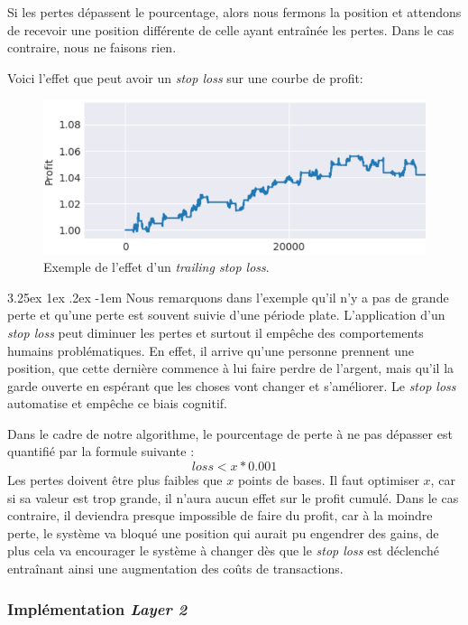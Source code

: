 \documentclass[a4paper, 11pt]{article}
\makeatletter
\renewcommand\paragraph{\@startsection{paragraph}{5}{\z@}%
  {3.25ex \@plus1ex \@minus.2ex}%
  {-1em}%
  {\normalfont\normalsize\bfseries}}
\makeatother
\begin{document}
Si les pertes dépassent le pourcentage, alors nous fermons la position et attendons de recevoir une position différente de celle ayant entraînée les pertes.
Dans le cas contraire, nous ne faisons rien.

Voici l'effet que peut avoir un \textit{stop loss} sur une courbe de profit:
\begin{figure}[H]
\centering
\includegraphics[scale=0.5]{images/stop_loss}
\caption{Exemple de l'effet d'un \textit{trailing stop loss}.}
\end{figure}

\paragraph{}
Nous remarquons dans l'exemple qu'il n'y a pas de grande perte et qu'une perte est souvent suivie d'une période plate. L'application d'un \textit{stop loss}
peut diminuer les pertes et surtout il empêche des comportements humains problématiques. En effet, il arrive qu'une personne prennent une position, que
cette dernière commence à lui faire perdre de l'argent, mais qu'il la garde ouverte en espérant que les choses vont changer et s'améliorer. Le \textit{stop loss}
automatise et empêche ce biais cognitif.

Dans le cadre de notre algorithme, le pourcentage de perte à ne pas dépasser est quantifié par la formule suivante :
$$loss < x * 0.001$$
Les pertes doivent être plus faibles que $x$ points de bases. Il faut optimiser $x$, car si sa valeur est trop grande, il n'aura aucun effet sur le profit
cumulé. Dans le cas contraire, il deviendra presque impossible de faire du profit, car à la moindre perte, le système va bloqué une position qui aurait pu
engendrer des gains, de plus cela va encourager le système à changer dès que le \textit{stop loss} est déclenché entraînant ainsi une augmentation des
coûts de transactions.

\subsubsection{Implémentation \textit{Layer 2}}
\end{document}
